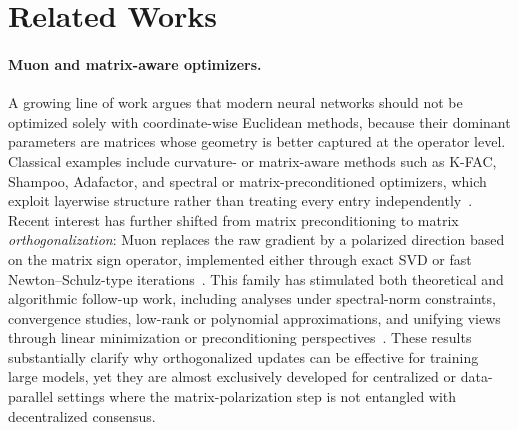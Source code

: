 \section{Related Works}

\paragraph{Muon and matrix-aware optimizers.}
A growing line of work argues that modern neural networks should not be optimized solely with coordinate-wise Euclidean methods, because their dominant parameters are matrices whose geometry is better captured at the operator level. Classical examples include curvature- or matrix-aware methods such as K-FAC, Shampoo, Adafactor, and spectral or matrix-preconditioned optimizers, which exploit layerwise structure rather than treating every entry independently~\cite{martens2015kfac,gupta2018shampoo,shazeer2018adafactor,carlson2015psd,carlson2015ssd,shi2023distributedshampoo}. Recent interest has further shifted from matrix preconditioning to matrix \emph{orthogonalization}: Muon replaces the raw gradient by a polarized direction based on the matrix sign operator, implemented either through exact SVD or fast Newton--Schulz-type iterations~\cite{polar_express_2025,kovalev2025gradientorth,bernstein2024oldoptimizer,he2025lowrank,liu2025muonscalable,shah2025practicalefficiency}. This family has stimulated both theoretical and algorithmic follow-up work, including analyses under spectral-norm constraints, convergence studies, low-rank or polynomial approximations, and unifying views through linear minimization or preconditioning perspectives~\cite{chen2025spectralnorm,li2025note,lau2025polargrad,sfyraki2025lionsmuons,pethick2025normconstrained,grishina2025chebyshev}. These results substantially clarify why orthogonalized updates can be effective for training large models, yet they are almost exclusively developed for centralized or data-parallel settings where the matrix-polarization step is not entangled with decentralized consensus.

